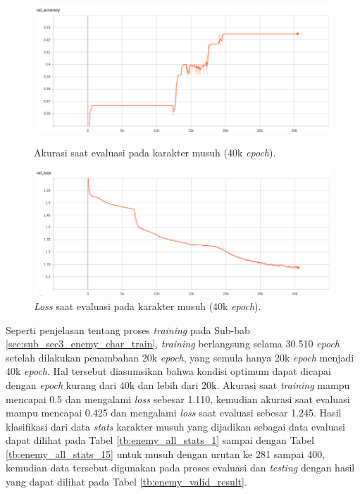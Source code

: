 \begin{figure} [!h] \centering
	\includegraphics[scale=0.42]{img/enemy_val_acc_40k_chap4.png}
	\caption{Akurasi saat evaluasi pada karakter musuh (40k \textit{epoch}).}
	\label{fig:nn_enemy_val_acc_40k_chap4}
	\vspace{4ex}
	
	\includegraphics[scale=0.42]{img/enemy_val_loss_40k_chap4.png}
	\caption{\textit{Loss} saat evaluasi pada karakter musuh (40k \textit{epoch}).}
	\label{fig:nn_enemy_val_loss_40k_chap4}
\end{figure}

Seperti penjelasan tentang proses \textit{training} pada Sub-bab \ref{sec:sub_sec3_enemy_char_train}, \textit{training} berlangsung selama 30.510 \textit{epoch} setelah dilakukan penambahan 20k \textit{epoch}, yang semula hanya 20k \textit{epoch} menjadi 40k \textit{epoch}. Hal tersebut diasumsikan bahwa kondisi optimum dapat dicapai dengan \textit{epoch} kurang dari 40k dan lebih dari 20k. Akurasi saat \textit{training} mampu mencapai 0.5 dan mengalami \textit{loss} sebesar 1.110, kemudian akurasi saat evaluasi mampu mencapai 0.425 dan mengalami \textit{loss} saat evaluasi sebesar 1.245. Hasil klasifikasi dari data \textit{stats} karakter musuh yang dijadikan sebagai data evaluasi dapat dilihat pada Tabel \ref{tb:enemy_all_stats_1} sampai dengan Tabel \ref{tb:enemy_all_stats_15} untuk musuh dengan urutan ke 281 sampai 400, kemudian data tersebut digunakan pada proses evaluasi dan \textit{testing} dengan hasil yang dapat dilihat pada Tabel \ref{tb:enemy_valid_result}.
\vspace{-2ex}

